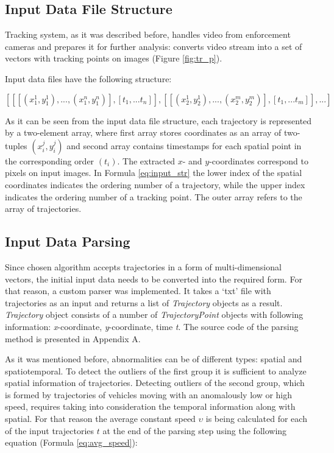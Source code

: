 \subsection{Input Data File Structure}

Tracking system, as it was described before, handles video from enforcement cameras and prepares it for further analysis: converts video stream into a set of vectors with tracking points on images (Figure \ref{fig:tr_p}).

Input data files have the following structure:

\begin{equation} \label{eq:input_str}
	[[[(x_1^1, y_1^1), ..., (x_1^n, y_1^n)], [t_1, ... t_n]], [[(x_2^1, y_2^1), ..., (x_2^m, y_2^m)], [t_1, ... t_m]], ...]
\end{equation}

As it can be seen from the input data file structure, each trajectory is represented by a two-element array, where first array stores coordinates as an array of two-tuples $(x_i^j, y_i^j)$ and second array contains timestamps for each spatial point in the corresponding order $(t_i)$. The extracted $x$- and $y$-coordinates correspond to pixels on input images. In Formula \ref{eq:input_str} the lower index of the spatial coordinates indicates the ordering number of a trajectory, while the upper index indicates the ordering number of a tracking point. The outer array refers to the array of trajectories.

\subsection{Input Data Parsing}

Since chosen algorithm accepts trajectories in a form of multi-dimensional vectors, the initial input data needs to be converted into the required form. For that reason, a custom parser was implemented. It takes a ‘txt’ file with trajectories as an input and returns a list of \textit{Trajectory} objects as a result. \textit{Trajectory} object consists of a number of \textit{TrajectoryPoint} objects with following information: \textit{x}-coordinate, \textit{y}-coordinate, time \textit{t}. The source code of the parsing method is presented in Appendix A.

As it was mentioned before, abnormalities can be of different types: spatial and spatiotemporal. To detect the outliers of the first group it is sufficient to analyze spatial information of trajectories. Detecting outliers of the second group, which is formed by trajectories of vehicles moving with an anomalously low or high speed, requires taking into consideration the temporal information along with spatial. For that reason the average constant speed $\upsilon$ is being calculated for each of the input trajectories $t$ at the end of the parsing step using the following equation (Formula \ref{eq:avg_speed}):

